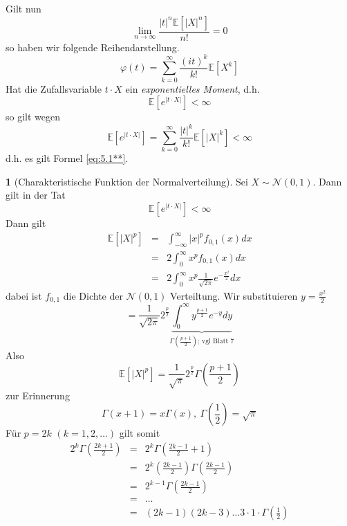 \documentclass[10pt,a4paper]{report}
\numberwithin{equation}{section}
\numberwithin{figure}{section}
\theoremstyle{plain}
\theoremstyle{definition}
\newtheorem{example}[thm]{\protect\examplename}
\theoremstyle{remark}
\theoremstyle{plain}
\providecommand{\examplename}{Beispiel}
\newcommand{\1}{ \mathbb{1} } %
\begin{document}
Gilt nun 
\[
\lim_{n\to\infty}\frac{\left|t\right|^{n}\mathbb{E}\left[\left|X\right|^{n}\right]}{n!}=0
\]
so haben wir folgende Reihendarstellung. 
\begin{equation}
  \varphi\left(t\right)=\sum_{k=0}^{\infty}\frac{\left(it\right)^{k}}{k!}\mathbb{E}\left[X^{k}\right]\label{eq:5.1**}
\end{equation}
Hat die Zufallsvariable $t\cdot X$ ein \emph{exponentielles
  Moment}, d.h. 
\[
\mathbb{E}\left[e^{\left|t\cdot X\right|}\right]<\infty
\]
so gilt wegen 
\[
\mathbb{E}\left[e^{\left|t\cdot X\right|}\right]=\sum_{k=0}^{\infty}\frac{\left|t\right|^{k}}{k!}\mathbb{E}\left[\left|X\right|^{k}\right]<\infty
\]
d.h. es gilt Formel \ref{eq:5.1**}. 
\begin{example}[Charakteristische Funktion der Normalverteilung] 
  Sei $X\sim\mathcal{N}\left(0,1\right)$. Dann gilt in der Tat
  \[
  \mathbb{E}\left[e^{\left|t\cdot X\right|}\right]<\infty
  \]
  Dann gilt 
  \begin{eqnarray*}
    \mathbb{E}\left[\left|X\right|^{p}\right] & = & \int_{-\infty}^{\infty}\left|x\right|^{p}f_{0,1}\left(x\right)dx\\
    & = & 2\int_{0}^{\infty}x^{p}f_{0,1}\left(x\right)dx\\
    & = & 2\int_{0}^{\infty}x^{p}\frac{1}{\sqrt{2\pi}}e^{-\frac{x^{2}}{2}}dx
  \end{eqnarray*}
  dabei ist $f_{0,1}$ die Dichte der $\mathcal{N}\left(0,1\right)$
  Verteiltung. Wir substituieren $y=\frac{x^{2}}{2}$
  \[
  =\frac{1}{\sqrt{2\pi}}2^{\frac{p}{2}}\underset{\Gamma\left(\frac{p+1}{2}\right)\mbox{; vgl Blatt 7}}{\underbrace{\int_{0}^{\infty}y^{\frac{p+1}{2}}e^{-y}dy}}
  \]
  Also 
  \[
  \mathbb{E}\left[\left|X\right|^{p}\right]=\frac{1}{\sqrt{\pi}}2^{\frac{p}{2}}\Gamma\left(\frac{p+1}{2}\right)
  \]
  zur Erinnerung
  \[
  \Gamma\left(x+1\right)=x\Gamma\left(x\right),\ \Gamma\left(\frac{1}{2}\right)=\sqrt{\pi}
  \]
  Für $p=2k$ $\left(k=1,2,\ldots\right)$ gilt somit 
  \begin{eqnarray*}
    2^{k}\Gamma\left(\frac{2k+1}{2}\right) & = & 2^{k}\Gamma\left(\frac{2k-1}{2}+1\right)\\
    & = & 2^{k}\left(\frac{2k-1}{2}\right)\Gamma\left(\frac{2k-1}{2}\right)\\
    & = & 2^{k-1}\Gamma\left(\frac{2k-1}{2}\right)\\
    & = & \ldots\\
    & = & \left(2k-1\right)\left(2k-3\right)\ldots3\cdot1\cdot\Gamma\left(\frac{1}{2}\right)

\end{eqnarray*}
\end{example}
\end{document}
